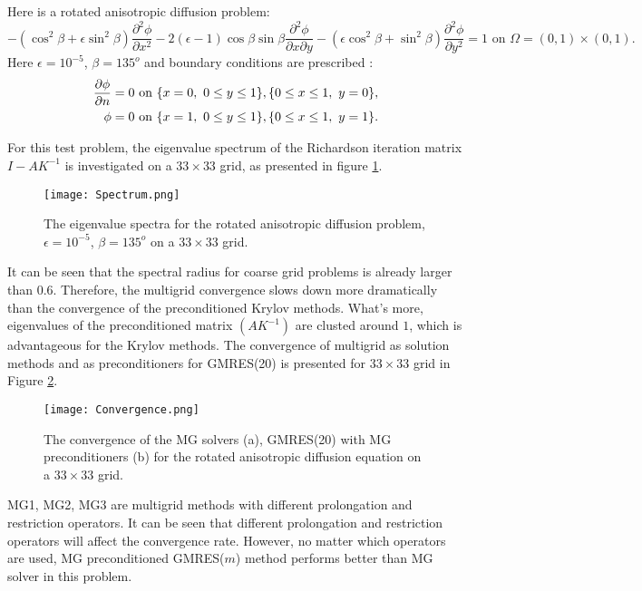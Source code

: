 \begin{exm}
  Here is a rotated anisotropic diffusion problem:
  \begin{equation}
    \label{eq:RotatingCon-D}
    -(\cos^2\beta +\epsilon\sin^2\beta)\frac{\partial^2\phi}{\partial
      x^2} - 2(\epsilon -
    1)\cos\beta\sin\beta\frac{\partial^2\phi}{\partial x\partial y} -
    (\epsilon\cos^2\beta + \sin^2\beta)\frac{\partial^2\phi}{\partial
      y^2} = 1
    \mbox{ on } \Omega=(0,1)\times (0,1).
\end{equation}
Here $\epsilon=10^{-5}$, $\beta=135^o$ and boundary conditions are prescribed :
\begin{equation}
  \begin{aligned}
    \frac{\partial \phi}{\partial n} = 0 \mbox{ on } \{x=0,\ 0\leq y\leq 1\},\{0\leq
    x\leq 1,\ y=0\},\\
    \phi=0\mbox{ on } \{x=1,\ 0\leq y\leq 1\},\{0\leq x\leq 1,\ y=1\}.
  \end{aligned}
\end{equation}

For this test problem, the eigenvalue spectrum of the Richardson
iteration matrix $I-AK^{-1}$ is investigated on a $33\times 33$ grid,
as presented in figure \ref{fig:spectrum}.

\begin{figure}[htbp]
      \centering
      \texttt{[image: Spectrum.png]}
      \caption{The eigenvalue spectra for the rotated anisotropic
        diffusion problem,$\epsilon=10^{-5}$, $\beta=135^o$ on a
        $33\times 33$ grid.}
      \label{fig:spectrum}
    \end{figure}

It can be seen that the spectral radius for coarse grid problems is
already larger than 0.6. Therefore, the multigrid convergence slows
down more dramatically than the convergence of the preconditioned
Krylov methods. What's more, eigenvalues of the preconditioned matrix
$(AK^{-1})$ are clusted around $1$, which is advantageous for the
Krylov methods. The convergence of multigrid as solution methods and
as preconditioners for GMRES(20) is presented for $33\times 33$ grid
in Figure \ref{fig:convergence}.

\begin{figure}[htbp]
      \centering
      \texttt{[image: Convergence.png]}
      \caption{The convergence of the MG solvers (a), GMRES(20)
        with MG preconditioners (b) for the rotated anisotropic
        diffusion equation on a $33\times 33$ grid.}
      \label{fig:convergence}
    \end{figure}

MG1, MG2, MG3 are multigrid methods with different prolongation and
restriction operators. It can be seen that different prolongation and
restriction operators will affect the convergence rate. However, no
matter which operators are used, MG preconditioned GMRES($m$) method
performs better than MG solver in this problem.
\end{exm}



